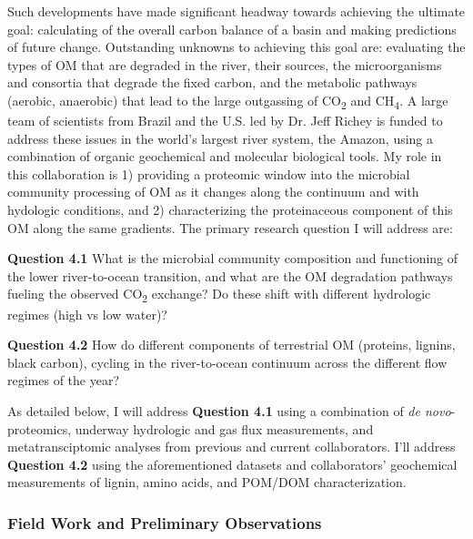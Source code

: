 \documentclass[12pt, letterpaper, twoside]{article}
\begin{document}
Such developments have made significant headway towards achieving the ultimate goal: calculating of the overall carbon balance of a basin and making predictions of future change. Outstanding unknowns to achieving this goal are: evaluating the types of OM that are degraded in the river, their sources, the microorganisms and consortia that degrade the fixed carbon, and the metabolic pathways (aerobic, anaerobic) that lead to the large outgassing of CO\textsubscript{2} and CH\textsubscript{4}. A large team of scientists from Brazil and the U.S. led by Dr. Jeff Richey is funded to address these issues in the world's largest river system, the Amazon, using a combination of organic geochemical and molecular biological tools. My role in this collaboration is 1) providing a proteomic window into the microbial community processing of OM as it changes along the continuum and with hydologic conditions, and 2) characterizing the proteinaceous component of this OM along the same gradients. The primary research question I will address are:

\bigskip

\textbf{Question 4.1} What is the microbial community composition and functioning of the lower river-to-ocean transition, and what are the OM degradation pathways fueling the observed CO\textsubscript{2} exchange? Do these shift with different hydrologic regimes (high vs low water)?

\bigskip

\textbf{Question 4.2} How do different components of terrestrial OM (proteins, lignins, black carbon), cycling in the river-to-ocean continuum across the different flow regimes of the year? 

\bigskip

As detailed below, I will address \textbf{Question 4.1} using a combination of \textit{de novo}-proteomics, underway hydrologic and gas flux measurements, and metatransciptomic analyses from previous \cite{doherty_bacterial_2017, satinsky_amazon_2014} and current collaborators. I'll address \textbf{Question 4.2} using the aforementioned datasets and collaborators' geochemical measurements of lignin, amino acids, and POM/DOM characterization. 

\subsubsection{Field Work and Preliminary Observations}
\end{document}
